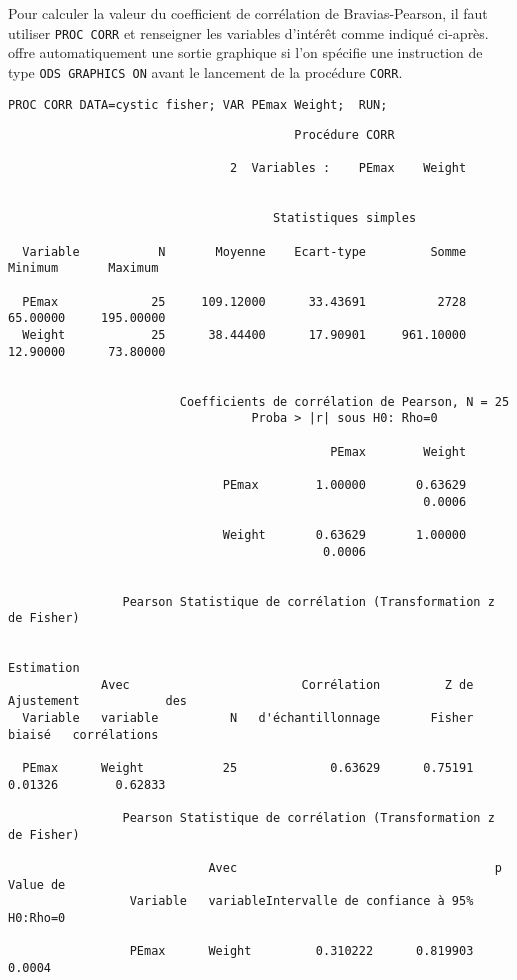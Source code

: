 Pour calculer la valeur du coefficient de corrélation de Bravias-Pearson, il
faut utiliser \texttt{PROC CORR} et renseigner les variables d'intérêt comme
indiqué ci-après. \SAS offre automatiquement une sortie graphique si l'on
spécifie une instruction de type \verb|ODS GRAPHICS ON| avant le lancement
de la procédure \texttt{CORR}. 
\begin{verbatim}
PROC CORR DATA=cystic fisher; VAR PEmax Weight;  RUN;
\end{verbatim}

\begin{verbatim}
                                        Procédure CORR

                               2  Variables :    PEmax    Weight


                                     Statistiques simples

  Variable           N       Moyenne    Ecart-type         Somme       Minimum       Maximum

  PEmax             25     109.12000      33.43691          2728      65.00000     195.00000
  Weight            25      38.44400      17.90901     961.10000      12.90000      73.80000


                        Coefficients de corrélation de Pearson, N = 25
                                  Proba > |r| sous H0: Rho=0

                                             PEmax        Weight

                              PEmax        1.00000       0.63629
                                                          0.0006

                              Weight       0.63629       1.00000
                                            0.0006


                Pearson Statistique de corrélation (Transformation z de Fisher)

                                                                                   Estimation
             Avec                        Corrélation         Z de   Ajustement            des
  Variable   variable          N   d'échantillonnage       Fisher       biaisé   corrélations

  PEmax      Weight           25             0.63629      0.75191      0.01326        0.62833

                Pearson Statistique de corrélation (Transformation z de Fisher)

                            Avec                                    p Value de
                 Variable   variableIntervalle de confiance à 95%     H0:Rho=0

                 PEmax      Weight         0.310222      0.819903       0.0004
\end{verbatim}

